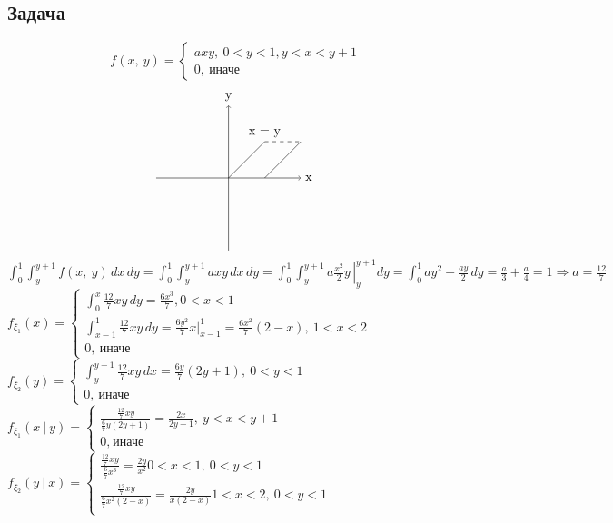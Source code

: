 \documentclass[12pt, a4paper]{article}
\begin{document}
    \subsection*{Задача}
    \[f(x,\ y) = \begin{cases}
        axy,\ 0 < y < 1, y < x < y + 1\\
        0,\ \text{иначе}
    \end{cases}\]
    \[\begin{tikzpicture}
        \draw[->] (-2, 0) -- (2, 0) node[anchor=west]{x};
        \draw[->] (0, -2) -- (0, 2) node[anchor=south]{y};
        \draw (0, 0) -- (1, 1) node[anchor=south]{x = y};
        \draw (1, 0) -- (2, 1);
        \draw[dashed] (1, 1) -- (2, 1);
    \end{tikzpicture}\]
    $\displaystyle \int_0^1\int_y^{y + 1} f(x,\ y)\, dx\, dy = \int_0^1 \int_y^{y + 1} axy\, dx\, dy = \int_0^1\int_y^{y + 1} a\left.\frac{x^2}{2} y\, \right|_y^{y + 1} dy = \int_0^1 ay^2 + \frac{ay}{2}\, dy = \frac{a}{3} + \frac{a}{4} = 1\Rightarrow a = \frac{12}{7}$\\
    $f_{\xi_1}(x) = \begin{cases}
        \displaystyle\int_0^x \frac{12}{7} xy\, dy = \frac{6x^3}{7}, 0 < x < 1\\
        \displaystyle\int_{x - 1}^{1} \frac{12}{7} xy\, dy = \frac{6y^2}{7} x |_{x - 1}^{1} = \frac{6x^2}{7}(2 - x),\ 1 < x < 2\\
        0,\ \text{иначе}
    \end{cases}$\\
    $f_{\xi_2}(y) = \begin{cases}
        \displaystyle\int_y^{y + 1} \frac{12}{7}xy\, dx = \frac{6y}{7}(2y + 1),\ 0 < y < 1\\
        0,\ \text{иначе}
    \end{cases}$\\
    $f_{\xi_1}(x\ |\ y) = \begin{cases}
        \frac{\frac{12}{7}xy}{\frac{6}{7} y(2y + 1)} = \frac{2x}{2y + 1},\ y < x < y + 1\\
        \text{0},\ \text{иначе}
    \end{cases}$\\
    $f_{\xi_2}(y\ |\ x) = \begin{cases}
        \frac{\frac{12}{7}xy}{\frac{6}{7}x^3}=\frac{2y}{x^2} 0 < x < 1,\ 0 < y < 1\\
        \frac{\frac{12}{7}xy}{\frac{6}{7}x^2(2 - x)} = \frac{2y}{x(2 - x)} 1 < x < 2,\ 0 < y < 1\\
    \end{cases}$\\
\end{document}
